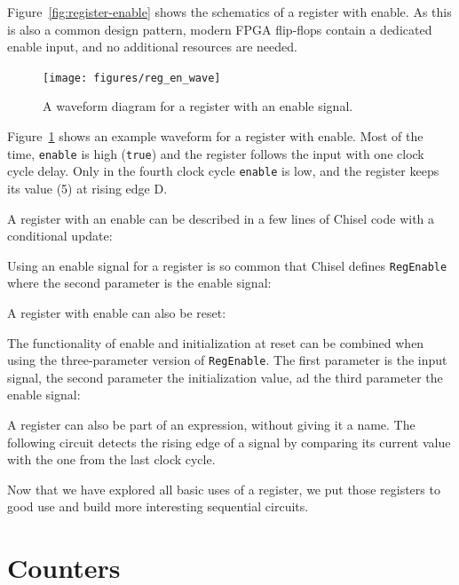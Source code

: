\documentclass[%
    10pt,
    headinclude, footexclude,
    openright, %
    notitlepage,
    cleardoubleempty,
    headsepline,
    pointlessnumbers,
    bibtotoc, idxtotoc,
    ]{scrbook}
\newcommand{\code}[1]{{\small{\texttt{#1}}}}
\begin{document}
Figure~\ref{fig:register-enable} shows the schematics of a register with enable.
As this is also a common design pattern, modern FPGA flip-flops contain a
dedicated enable input, and no additional resources are needed.

\begin{figure}
  \centering
  \texttt{[image: figures/reg\_en\_wave]}
  \caption{A waveform diagram for a register with an enable signal.}
  \label{fig:register-en-wave}
\end{figure}

Figure~\ref{fig:register-en-wave} shows an example waveform for a register
with enable. Most of the time, \code{enable} is high (\code{true}) and the register
follows the input with one clock cycle delay. Only in the fourth clock cycle
\code{enable} is low, and the register keeps its value (5) at rising edge D.

A register with an enable can be described in a few lines of Chisel code
with a conditional update:


\noindent Using an enable signal for a register is so common that Chisel defines
\code{RegEnable} where the second parameter is the enable signal:


\noindent A register with enable can also be reset:


\noindent The functionality of enable and initialization at reset can be combined when
using the three-parameter version of \code{RegEnable}. The first parameter is the input signal,
the second parameter the initialization value, ad the third parameter the enable signal:




A register can also be part of an expression, without giving it a name.
The following circuit detects the rising edge of a signal by comparing its current
value with the one from the last clock cycle.


Now that we have explored all basic uses of a register, we put those registers to
good use and build more interesting sequential circuits.

\section{Counters}
\label{sec:counter}
\end{document}
